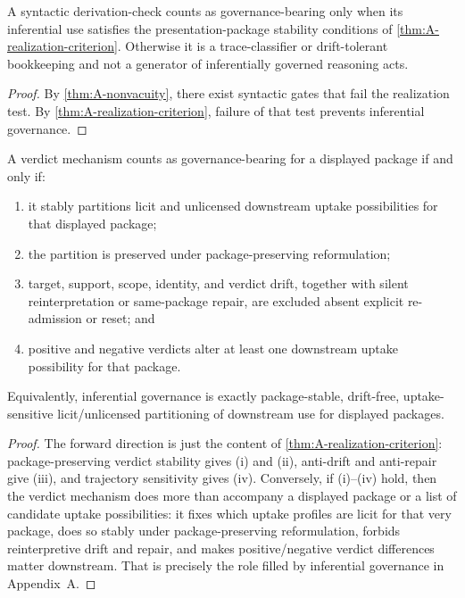 \begin{corollary}
\label{cor:A-not-all-gates}
A syntactic derivation-check counts as governance-bearing only when its inferential use satisfies the presentation-package stability conditions of \cref{thm:A-realization-criterion}. Otherwise it is a trace-classifier or drift-tolerant bookkeeping and not a generator of inferentially governed reasoning acts.
\end{corollary}

\begin{proof}
By \cref{thm:A-nonvacuity}, there exist syntactic gates that fail the realization test. By \cref{thm:A-realization-criterion}, failure of that test prevents inferential governance.
\end{proof}

\begin{proposition}
\label{prop:A-characterize-governance}
A verdict mechanism counts as governance-bearing for a displayed package if and only if:
\begin{enumerate}[label=(\roman*), leftmargin=2.5em]
    \item it stably partitions licit and unlicensed downstream uptake possibilities for that displayed package;
    \item the partition is preserved under package-preserving reformulation;
    \item target, support, scope, identity, and verdict drift, together with silent reinterpretation or same-package repair, are excluded absent explicit re-admission or reset; and
    \item positive and negative verdicts alter at least one downstream uptake possibility for that package.
\end{enumerate}
Equivalently, inferential governance is exactly package-stable, drift-free, uptake-sensitive licit/unlicensed partitioning of downstream use for displayed packages.
\end{proposition}

\begin{proof}
The forward direction is just the content of \cref{thm:A-realization-criterion}: package-preserving verdict stability gives (i) and (ii), anti-drift and anti-repair give (iii), and trajectory sensitivity gives (iv). Conversely, if (i)--(iv) hold, then the verdict mechanism does more than accompany a displayed package or a list of candidate uptake possibilities: it fixes which uptake profiles are licit for that very package, does so stably under package-preserving reformulation, forbids reinterpretive drift and repair, and makes positive/negative verdict differences matter downstream. That is precisely the role filled by inferential governance in Appendix~A.
\end{proof}

